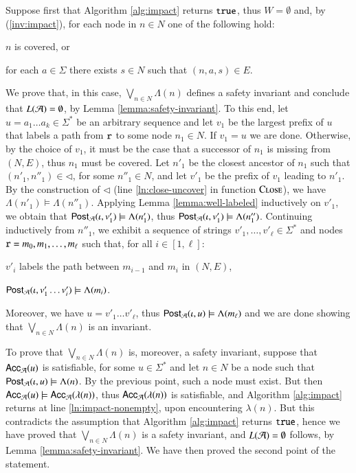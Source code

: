 \documentclass[10pt,conference,letterpaper,twocolumn]{IEEEtran}
\begin{document}
{  Suppose first that Algorithm \ref{alg:impact} returns $\mathtt{true}$, thus
  $W = \emptyset$ and, by (\ref{inv:impact}), for each node in $n \in
  N$ one of the following hold: \begin{compactitem}
  \item $n$ is covered, or
  \item for each $a \in \Sigma$ there exists $s \in N$ such that
    $(n,a,s) \in E$. 
  \end{compactitem}
  We prove that, in this case, $\bigvee_{n \in N} \Lambda(n)$ defines
  a safety invariant and conclude that $L(\mathcal{A}) = \emptyset$, by Lemma
  \ref{lemma:safety-invariant}. To this end, let $u = a_1 \ldots a_k
  \in \Sigma^*$ be an arbitrary sequence and let $v_1$ be the largest
  prefix of $u$ that labels a path from $\mathtt{r}$ to some node $n_1
  \in N$. If $v_1 = u$ we are done. Otherwise, by the choice of $v_1$,
  it must be the case that a successor of $n_1$ is missing from
  $(N,E)$, thus $n_1$ must be covered. Let $n'_1$ be the closest
  ancestor of $n_1$ such that $(n'_1,n''_1) \in \lhd$, for some $n''_1
  \in N$, and let $v'_1$ be the prefix of $v_1$ leading to $n'_1$. By
  the construction of $\lhd$ (line \ref{ln:close-uncover} in function
  $\Call{Close}{}$), we have $\Lambda(n'_1) \models
  \Lambda(n''_1)$. Applying Lemma \ref{lemma:well-labeled} inductively
  on $v'_1$, we obtain that $\mathsf{Post}_{\mathcal{A}}(\iota,v'_1) \models
  \Lambda(n'_1)$, thus $\mathsf{Post}_{\mathcal{A}}(\iota,v'_1) \models \Lambda(n''_1)$.
  Continuing inductively from $n''_1$, we exhibit a sequence of
  strings $v'_1,\ldots,v'_\ell \in \Sigma^*$ and nodes $\mathtt{r} =
  m_0,m_1,\ldots,m_\ell$ such that, for all $i \in
  [1,\ell]$: \begin{compactitem}
  \item $v'_i$ labels the path between $m_{i-1}$ and $m_i$ in $(N,E)$,    
  \item $\mathsf{Post}_{\mathcal{A}}(\iota,v'_1\ldots v'_i) \models \Lambda(m_i)$.
  \end{compactitem}
  Moreover, we have $u = v'_1 \ldots v'_\ell$, thus
  $\mathsf{Post}_{\mathcal{A}}(\iota,u) \models \Lambda(m_\ell)$ and we are done showing
  that $\bigvee_{n\in N} \Lambda(n)$ is an invariant. 

  To prove that $\bigvee_{n \in N} \Lambda(n)$ is, moreover, a safety
  invariant, suppose that $\mathsf{Acc}_{\mathcal{A}}(u)$ is satisfiable, for some $u
  \in \Sigma^*$ and let $n \in N$ be a node such that
  $\mathsf{Post}_{\mathcal{A}}(\iota,u) \models \Lambda(n)$. By the previous point, such
  a node must exist. But then $\mathsf{Acc}_{\mathcal{A}}(u) \models
  \mathsf{Acc}_{\mathcal{A}}(\lambda(n))$, thus $\mathsf{Acc}_{\mathcal{A}}(\lambda(n))$ is
  satisfiable, and Algorithm \ref{alg:impact} returns at line
  \ref{ln:impact-nonempty}, upon encountering $\lambda(n)$. But this
  contradicts the assumption that Algorithm \ref{alg:impact} returns
  $\mathtt{true}$, hence we have proved that $\bigvee_{n \in N} \Lambda(n)$ is
  a safety invariant, and $L(\mathcal{A}) = \emptyset$ follows, by Lemma
  \ref{lemma:safety-invariant}. We have then proved the second point
  of the statement.

}
\end{document}
